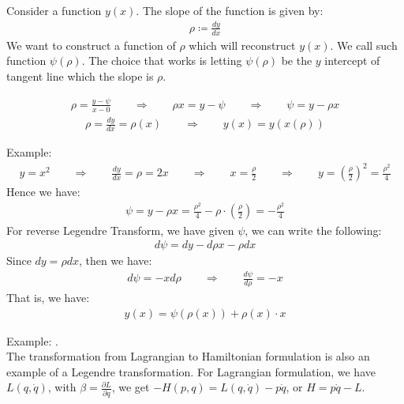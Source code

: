 \documentclass[11pt,oneside]{book}
\theoremstyle{break}
\theoremstyle{break}
\newcommand{\lr}[1]{\left( #1 \right)}
\newcommand{\example}{\color{green}Example: \color{black}}
\begin{document}
Consider a function $y(x)$. The slope of the function is given by:
\begin{align*}
\rho \coloneqq \frac{dy}{dx}
\end{align*}
We want to construct a function of $\rho$ which will reconstruct $y(x)$. We call such function $\psi (\rho)$. The choice that works is letting $\psi(\rho)$ be the $y$ intercept of tangent line which the slope is $\rho$. 

\begin{align*}
\rho = \frac{y - \psi}{x-0} \qquad \Rightarrow \qquad\rho x = y-\psi \qquad \Rightarrow \qquad \psi = y-\rho x 
\end{align*}
\begin{align*}
\rho  = \frac{dy}{dx} = \rho(x) \qquad \Rightarrow \qquad y(x) = y(x(\rho))
\end{align*}

\example
\begin{align*}
y = x^2 \qquad \Rightarrow \qquad \frac{dy}{dx} = \rho = 2x \qquad \Rightarrow \qquad x = \frac{\rho}{2} \qquad \Rightarrow \qquad y = \lr{\frac{\rho}{2}}^2 = \frac{\rho^2}{4}
\end{align*}
Hence we have:
\begin{align*}
\psi = y - \rho x = \frac{\rho^2}{4} - \rho\cdot \lr{\frac{\rho}{2}} = -\frac{\rho^2}{4}
\end{align*}
\hfill\break
\hfill\break
\hfill\break
For reverse Legendre Transform, we have given $\psi$, we can write the following:
\begin{align*}
d\psi = dy - d\rho x - \rho dx
\end{align*}
Since $dy = \rho dx$, then we have:
\begin{align*}
d\psi = -xd\rho \qquad\Rightarrow \qquad \frac{d\psi}{d\rho}= -x
\end{align*}
That is, we have:
\begin{align*}
y(x) =  \psi(\rho(x)) + \rho(x)\cdot x
\end{align*}


\example.\\
The transformation from Lagrangian to Hamiltonian formulation is also an example of a Legendre transformation. For Lagrangian formulation, we have $L(q,\dot{q})$, with $\beta = \frac{\partial L}{\partial \dot{q}}$, we get $-H(p,q) = L(q,\dot{q}) - p \dot{q}$, or $H = p\dot{q}-L$. \\

\newpage
\end{document}
